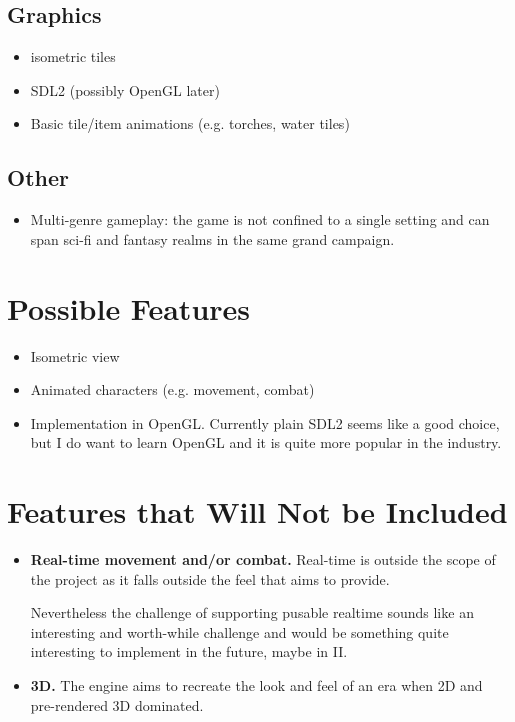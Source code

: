 \documentclass[a4paper,10pt]{book}
\begin{document}
\subsection{Graphics}
\begin{itemize}
  \item isometric tiles
  \item SDL2 (possibly OpenGL later)
  \item Basic tile/item animations (e.g. torches, water tiles)
\end{itemize}

\subsection{Other}
\begin{itemize}
  \item Multi-genre gameplay: the game is not confined to a single setting and
    can span sci-fi and fantasy realms in the same grand campaign.
\end{itemize}

\section{Possible Features}
\begin{itemize}
  \item Isometric view
  \item Animated characters (e.g. movement, combat)
  \item Implementation in OpenGL. Currently plain SDL2 seems like a good
    choice, but I do want to learn OpenGL and it is quite more popular in the
    industry.
\end{itemize}

\section{Features that Will Not be Included}
\begin{itemize}
  \item \textbf{Real-time movement and/or combat.} Real-time is outside the
    scope of the project as it falls outside the feel that \Gamename{} aims to
    provide.
 
  Nevertheless the challenge of supporting pusable realtime sounds like an
    interesting and worth-while challenge and would be something quite
    interesting to implement in the future, maybe in \Enginename{} II.
 
  \item \textbf{3D.} The engine aims to recreate the look and feel of an era
    when 2D and pre-rendered 3D dominated.
\end{itemize}
\end{document}
